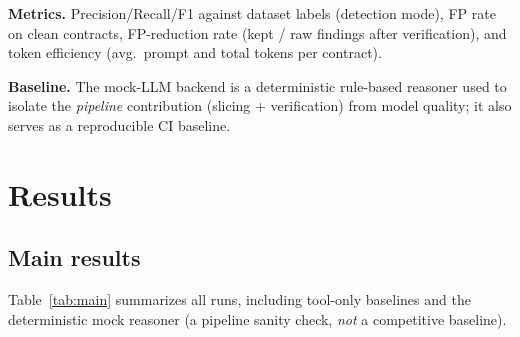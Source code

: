 \documentclass[conference]{IEEEtran}
\begin{document}
\textbf{Metrics.} Precision/Recall/F1 against dataset labels (detection mode), FP rate on clean
contracts, FP-reduction rate (kept / raw findings after verification), and token efficiency
(avg.\ prompt and total tokens per contract).

\textbf{Baseline.} The mock-LLM backend is a deterministic rule-based reasoner used to isolate the
\emph{pipeline} contribution (slicing + verification) from model quality; it also serves as a
reproducible CI baseline.

\section{Results}

\subsection{Main results}
Table~\ref{tab:main} summarizes all runs, including tool-only baselines and the deterministic
mock reasoner (a pipeline sanity check, \emph{not} a competitive baseline).
\end{document}

